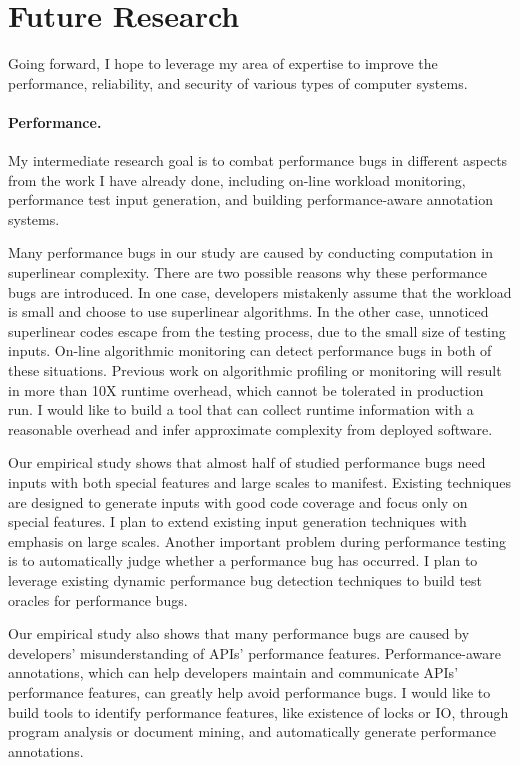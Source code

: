 \documentclass[10pt]{article}
\begin{document}
\vspace{-.1in}
\section{Future Research}

Going forward, I hope to leverage my area of expertise to improve the performance, 
reliability, and security of various types of computer systems. 

\vspace{-.1in}
\paragraph{Performance.} 
My intermediate research goal is to combat performance bugs 
in different aspects from the work I have already done, 
including on-line workload monitoring, performance test input generation, 
and building performance-aware annotation systems. 


Many performance bugs in our study are caused by conducting computation in superlinear complexity. 
There are two possible reasons why these performance bugs are introduced. 
In one case, developers mistakenly assume that the workload is small and choose to use superlinear algorithms. 
In the other case, unnoticed superlinear codes escape from the testing process, due to the small size of testing inputs. 
On-line algorithmic monitoring can detect performance bugs in both of these situations. 
Previous work on algorithmic profiling or monitoring will result in more than 10X runtime overhead, 
which cannot be tolerated in production run.
I would like to build a tool that can collect runtime information with a reasonable overhead 
and infer approximate complexity from deployed software. 

Our empirical study shows that almost half of studied performance bugs need inputs with both special features and large scales to manifest. 
Existing techniques are designed to generate inputs with good code coverage and focus only on special features.
I plan to extend existing input generation techniques with emphasis on large scales. 
Another important problem during performance testing is to automatically judge whether a performance bug has occurred. 
I plan to leverage existing dynamic performance bug detection techniques to build test oracles for performance bugs.

Our empirical study also shows that many performance bugs are caused by developers' misunderstanding of APIs' performance features. 
Performance-aware annotations, which can help developers maintain and communicate APIs' performance features, 
can greatly help avoid performance bugs. 
I would like to build tools to identify performance features, like existence of locks or IO, 
through program analysis or document mining, 
and automatically generate performance annotations. 
\end{document}
